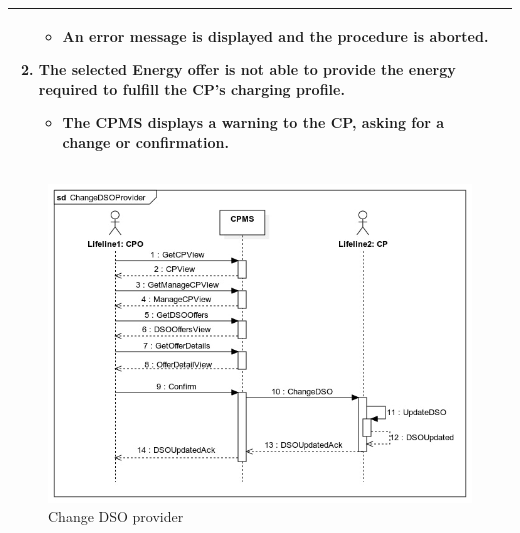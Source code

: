 \documentclass{Configuration_Files/PoliMi3i_thesis}
\begin{document}
\begin{table}[H]
\begin{xltabular}{\textwidth}{| >{}l | X |}
\begin{enumerate}
        \begin{itemize}
            \item An error message is displayed and the procedure is aborted.
        \end{itemize}
        \item The selected Energy offer is not able to provide the energy required to fulfill the CP’s charging profile.
        \begin{itemize}
            \item The CPMS displays a warning to the CP, asking for a change or confirmation.
        \end{itemize}
        \end{enumerate}\B\\
    \hline
    \end{xltabular}
\end{table}

\begin{figure}[H]
    \centering
    \includegraphics[width=1\textwidth]{Images/UseCases/ChangeDSOProvider.jpg}
    \caption{Change DSO provider}
\end{figure}

\end{document}
